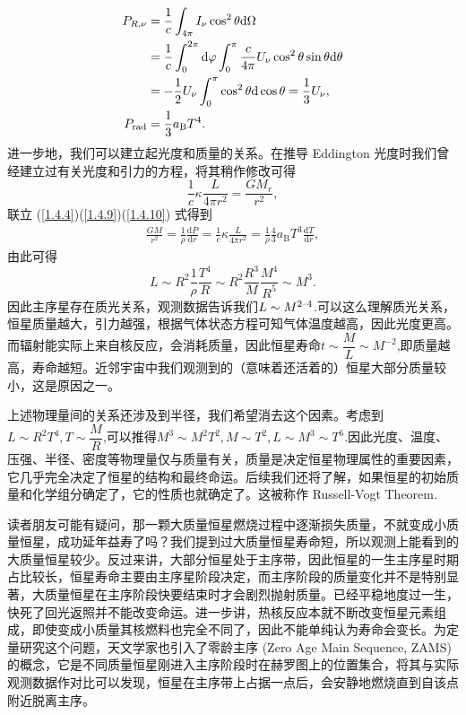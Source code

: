\documentclass[../天体物理基础.tex]{subfiles}
\begin{document}
\begin{align}
P_{R,\nu}&=\frac{1}{c}\int_{4\pi{}}I_{\nu}\cos^{2}\theta\mathrm{d}\Omega\notag\\
&=\frac{1}{c}\int_{0}^{2\pi{}}\mathrm{d}\varphi\int_{0}^{\pi}\frac{c}{4\pi{}}U_{\nu}\cos^{2}\theta\sin\theta\mathrm{d}\theta\notag\\
&=-\frac{1}{2}U_{\nu}\int_{0}^{\pi}\cos^{2}\theta\mathrm{d}\cos\theta=\frac{1}{3}U_{\nu},\notag\\
P_{\text{rad}}&=\frac{1}{3}a_{\text{B}}T^{4}.\label{1.4.9}
\end{align}
进一步地，我们可以建立起光度和质量的关系。在推导 Eddington 光度时我们曾经建立过有关光度和引力的方程，将其稍作修改可得
\begin{equation}
\frac{1}{c}\kappa\frac{L}{4\pi r^{2}}=\frac{GM_{r}}{r^{2}},\label{1.4.10}
\end{equation}
联立 (\ref{1.4.4})(\ref{1.4.9})(\ref{1.4.10}) 式得到
\begin{align}
\frac{GM}{r^{2}}=\frac{1}{\rho}\frac{\mathrm{d}P}{\mathrm{d}r}=\frac{1}{c}\kappa\frac{L}{4\pi r^{2}}=\frac{1}{\rho}\frac{4}{3}a_{\text{B}}T^{3}\frac{\mathrm{d}T}{\mathrm{d}r},\label{1.4.11}
\end{align}
由此可得
\begin{equation}
L\sim R^{2}\frac{1}{\rho}\frac{T^{4}}{R}\sim R^{2}\frac{R^{3}}{M}\frac{M^{4}}{R^{5}}\sim M^{3}.
\end{equation}
因此主序星存在质光关系，观测数据告诉我们$L\sim M^{2\text{\textendash}4}$.可以这么理解质光关系，恒星质量越大，引力越强，根据气体状态方程可知气体温度越高，因此光度更高。而辐射能实际上来自核反应，会消耗质量，因此恒星寿命$t\sim\dfrac{M}{L}\sim M^{-2}$,即质量越高，寿命越短。近邻宇宙中我们观测到的（意味着还活着的）恒星大部分质量较小，这是原因之一。

上述物理量间的关系还涉及到半径，我们希望消去这个因素。考虑到$L\sim R^{2}T^{4},T\sim\dfrac{M}{R}$,可以推得$M^{3}\sim M^{2}T^{2},M\sim T^{2},L\sim M^{3}\sim T^{6}$.因此光度、温度、压强、半径、密度等物理量仅与质量有关，质量是决定恒星物理属性的重要因素，它几乎完全决定了恒星的结构和最终命运。后续我们还将了解，如果恒星的初始质量和化学组分确定了，它的性质也就确定了。这被称作 Russell-Vogt Theorem.

读者朋友可能有疑问，那一颗大质量恒星燃烧过程中逐渐损失质量，不就变成小质量恒星，成功延年益寿了吗？我们提到过大质量恒星寿命短，所以观测上能看到的大质量恒星较少。反过来讲，大部分恒星处于主序带，因此恒星的一生主序星时期占比较长，恒星寿命主要由主序星阶段决定，而主序阶段的质量变化并不是特别显著，大质量恒星在主序阶段快要结束时才会剧烈抛射质量。已经平稳地度过一生，快死了回光返照并不能改变命运。进一步讲，热核反应本就不断改变恒星元素组成，即使变成小质量其核燃料也完全不同了，因此不能单纯认为寿命会变长。为定量研究这个问题，天文学家也引入了零龄主序 (Zero Age Main Sequence, ZAMS) 的概念，它是不同质量恒星刚进入主序阶段时在赫罗图上的位置集合，将其与实际观测数据作对比可以发现，恒星在主序带上占据一点后，会安静地燃烧直到自该点附近脱离主序。
\end{document}
